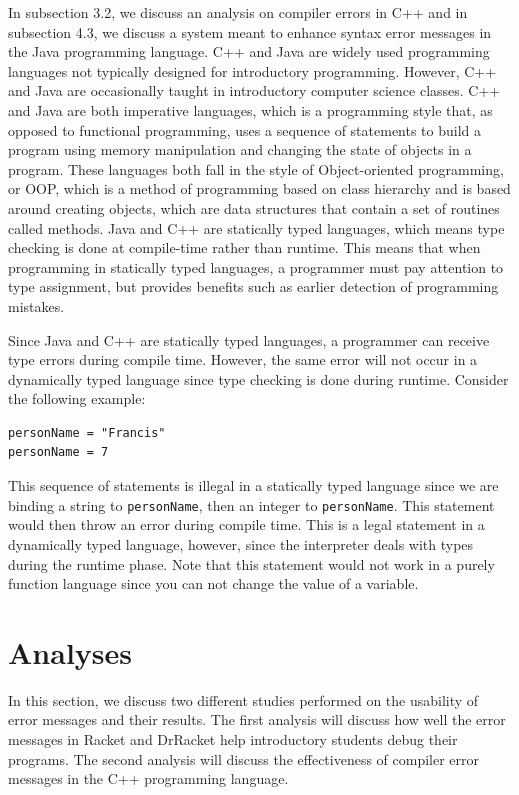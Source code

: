 \documentclass{sig-alternate}
\begin{document}
In subsection 3.2, we discuss an analysis on compiler errors in C++ and in subsection 4.3, we discuss a system meant to enhance syntax error messages in the Java programming language.
C++ and Java are widely used programming languages not typically designed for introductory programming.
However, C++ and Java are occasionally taught in introductory computer science classes.
C++ and Java are both imperative languages, which is a programming style that, as opposed to functional programming, uses a sequence of statements to build a program using memory manipulation and changing the state of objects in a program.
These languages both fall in the style of Object-oriented programming, or OOP, which is a method of programming based on class hierarchy and is based around creating objects, which are data structures that contain a set of routines called methods. 
Java and C++ are statically typed languages, which means type checking is done at compile-time rather than runtime. 
This means that when programming in statically typed languages, a programmer must pay attention to type assignment, but provides benefits such as earlier detection of programming mistakes.

Since Java and C++ are statically typed languages, a programmer can receive type errors during compile time.
However, the same error will not occur in a dynamically typed language since type checking is done during runtime.
Consider the following example:

\begin{verbatim}
personName = "Francis"
personName = 7
\end{verbatim}

This sequence of statements is illegal in a statically typed language since we are binding a string to \texttt{personName}, then an integer to \texttt{personName}.
This statement would then throw an error during compile time.
This is a legal statement in a dynamically typed language, however, since the interpreter deals with types during the runtime phase.
Note that this statement would not work in a purely function language since you can not change the value of a variable.


\section{Analyses}\label{sec:analyses}
In this section, we discuss two different studies performed on the usability of error messages and their results.
The first analysis will discuss how well the error messages in Racket and DrRacket help introductory students debug their programs.
The second analysis will discuss the effectiveness of compiler error messages in the C++ programming language. 
\end{document}
